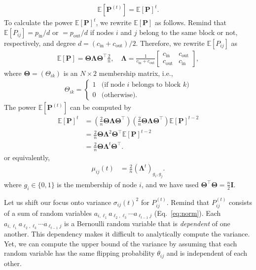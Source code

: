 \documentclass[12pt]{article} %
\def\mat#1{\mathbf{#1}}
\def\Exp{{\mathbb E}}
\def\ie{i.e.,~}
\begin{document}
\begin{align}
    \Exp\left[ \mat{P}^{(t)} \right]  = \Exp\left[ \mat{P} \right] ^t.
\end{align}
To calculate the power $\Exp\left[ \mat{P} \right] ^t$, we rewrite $\Exp\left[ \mat{P} \right]$ as follows.
Remind that $\Exp\left[ P_{ij} \right] = p_\text{in}/d$ or $= p_\text{out}/d$ if nodes $i$ and $j$ belong
to the same block or not, respectively, and
degree $d = (c_{\text{in}} + c_{\text{out}})/2$.
Therefore, we rewrite $\Exp\left[ P_{ij} \right]$ as
\begin{align}
     \Exp\left[ \mat{P} \right] = \mat{\Theta} \mat{\Lambda}\mat{\Theta}^\top  \frac{2}{n},\quad
    \mat{\Lambda} =
    \frac{1}{c_{\text{in}} + c_{\text{out}}}\left[
    \begin{array}{cc}
        c_{\text{in}} &
        c_{\text{out}} \\
        c_{\text{out}} &
        c_{\text{in}}
    \end{array}
    \right],
\end{align}
where $\mat{\Theta} = (\Theta_{ik})$ is an $N\times 2$ membership matrix, \ie
\begin{align}
    \Theta_{ik} = \left\{
        \begin{array}{cl}
           1 & \text{(if node $i$ belongs to block $k$)} \\
           0 & \text{(otherwise)}.
        \end{array}
    \right.
\end{align}
The power $\Exp\left[ \mat{P}^{(t)} \right]$ can be computed by
\begin{align}
    \Exp\left[ \mat{P} \right] ^t &=
    \left( \frac{2}{n}\mat{\Theta} \mat{\Lambda} \mat{\Theta}^\top\right) \left(\frac{2}{n}\mat{\Theta} \mat{\Lambda} \mat{\Theta}^\top \right)\Exp\left[ \mat{P} \right] ^{t-2} \nonumber \\
    & = \frac{2}{n}\mat{\Theta} \mat{\Lambda}^2 \mat{\Theta}^\top \Exp\left[ \mat{P} \right] ^{t-2} \nonumber \\
    & = \frac{2}{n}\mat{\Theta} \mat{\Lambda}^t \mat{\Theta}^\top.
\end{align}
or equivalently,
\begin{align}
    \mu_{ij}(t)
    & = \frac{2}{n}\left(\mat{\Lambda}^t \right)_{g_i, g_j}.
\end{align}
where $g_i \in \{0, 1\}$ is the membership of node $i$, and we have used $\mat{\Theta}^\top \mat{\Theta} = \frac{n}{2}\mat{I}$.

Let us shift our focus onto variance $\sigma_{ij}(t)^2$ for $P_{ij} ^{(t)}$.
Remind that $P_{ij} ^{(t)}$ consists of a sum of random variables $a_{i,\ell_1}a_{\ell_2,\ell_3} \cdots a_{\ell_{t-1}j}$ (Eq.~\eqref{eq:norm}).
Each $a_{i,\ell_1}a_{\ell_2,\ell_3} \cdots a_{\ell_{t-1}j}$ is a Bernoulli random variable that is \textit{dependent} of one another.
This dependency makes it difficult to analytically compute the variance.
Yet, we can compute the upper bound of the variance by assuming that each random variable has the same flipping probability $\theta_{ij}$ and is independent of each other.
\end{document}
